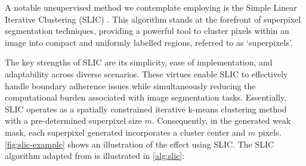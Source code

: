 A notable unsupervised method we contemplate employing is the Simple Linear Iterative Clustering (SLIC) \cite{achanta2010slic}. This algorithm stands at the forefront of superpixel segmentation techniques, providing a powerful tool to cluster pixels within an image into compact and uniformly labelled regions, referred to as `superpixels'.

The key strengths of SLIC are its simplicity, ease of implementation, and adaptability across diverse scenarios. These virtues enable SLIC to effectively handle boundary adherence issues while simultaneously reducing the computational burden associated with image segmentation tasks. Essentially, SLIC operates as a spatially constrained iterative k-means clustering method with a pre-determined superpixel size \(m\). Consequently, in the generated weak mask, each superpixel generated incorporates a cluster center and \(m\) pixels. \autoref{fig:slic-example} shows an illustration of the effect using SLIC. The SLIC algorithm adapted from \cite{achanta2010slic} is illustrated in \autoref{alg:slic}:

